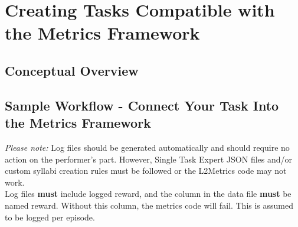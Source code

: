 \chapter{Creating Tasks Compatible with the Metrics Framework}\label{ch:task_design}

\section{Conceptual Overview}

\section{Sample Workflow - Connect Your Task Into the Metrics Framework}

\textit{Please note:} Log files should be generated automatically and should require no action on the performer's part. However, Single Task Expert JSON files and/or custom syllabi creation rules must be followed or the L2Metrics code may not work.\\[0.1in]

Log files \textbf{must} include logged reward, and the column in the data file \textbf{must} be named reward. Without this column, the metrics code will fail. This is assumed to be logged per episode. \\[0.1in]

